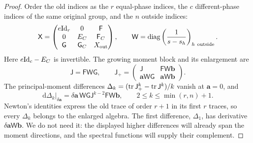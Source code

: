 \begin{proof}
Order the old indices as the $r$ equal-phase indices, the $c$
different-phase indices of the same original group, and the $n$
outside indices:
\begin{equation}\label{eq:canonical-insertion-blocks}
 \mathsf X=
 \begin{pmatrix}e\mathrm{Id}_r&0&\mathsf F\\0&E_C&\mathsf F_C\\\mathsf G&\mathsf G_C&X_{\rm out}\end{pmatrix},
 \qquad
 \mathsf W=\operatorname{diag}\left(\frac1{s-s_h}\right)_{h\ {\rm outside}}.
\end{equation}
Here $e\mathrm{Id}_c-E_C$ is invertible. The growing moment block and its
enlargement are
\[
 \mathsf J=\mathsf F\mathsf W \mathsf G,\qquad
 \mathsf J_+=\begin{pmatrix}\mathsf J&\mathsf F\mathsf W \boldsymbol b\\\boldsymbol a\mathsf W \mathsf G&\boldsymbol a\mathsf W \boldsymbol b\end{pmatrix}.
\]
The principal-moment differences
$\Delta_k=(\operatorname{tr} \mathsf J_+^k-\operatorname{tr} \mathsf J^k)/k$ vanish at $\boldsymbol a=0$, and
\begin{equation}\label{eq:canonical-insertion-moment}
 \left.\mathrm d\Delta_k\right|_{\delta \boldsymbol a}
   =\delta \boldsymbol a\,\mathsf W \mathsf G \mathsf J^{k-2}\mathsf F\mathsf W \boldsymbol b,
 \qquad 2\leq k\leq\min(r,n)+1.
\end{equation}
Newton's identities express the old trace of order $r+1$ in its
first $r$ traces, so every $\Delta_k$ belongs to the enlarged algebra.
The first difference, $\Delta_1$, has derivative
$\delta\boldsymbol a\mathsf W\boldsymbol b$. We do not need it:
the displayed higher differences will already span the moment
directions, and the spectral functions will supply their complement.


\end{proof}
